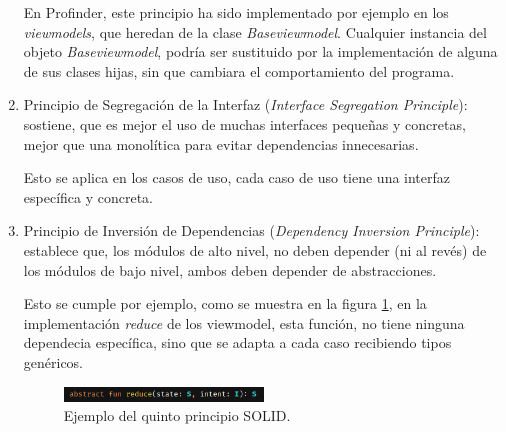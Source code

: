 \begin{enumerate}
    En Profinder, este principio ha sido implementado por ejemplo en los \textit{viewmodels}, que heredan de la clase \textit{Baseviewmodel}. Cualquier instancia del objeto \textit{Baseviewmodel}, podría ser sustituido por la implementación de alguna de sus clases hijas, sin que cambiara el comportamiento del programa.
    \item Principio de Segregación de la Interfaz (\textit{Interface Segregation Principle}):  sostiene, que es mejor el uso de muchas interfaces pequeñas y concretas, mejor que una monolítica para evitar dependencias innecesarias.
    
    Esto se aplica en los casos de uso, cada caso de uso tiene una interfaz específica y concreta.
    \item Principio de Inversión de Dependencias (\textit{Dependency Inversion Principle}): establece que, los módulos de alto nivel, no deben depender (ni al revés) de los módulos de bajo nivel, ambos deben depender de abstracciones.
    
    Esto se cumple por ejemplo, como se muestra en la figura \ref{fig:ejemplo_reduce}, en la implementación \textit{reduce} de los viewmodel, esta función, no tiene ninguna dependecia específica, sino que se adapta a cada caso recibiendo tipos genéricos.
    \begin{figure}[h]
        \centering
        \includegraphics[width = 0.5\textwidth]{Imagenes/Fuentes/ejemplo_reduce.png}
        \caption{Ejemplo del quinto principio SOLID.}
        \label{fig:ejemplo_reduce}
    \end{figure}
\end{enumerate}

